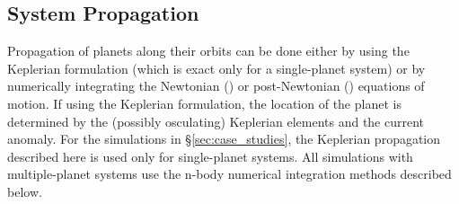 \subsection{System Propagation}\label{sec:sysProp}
Propagation of planets along their orbits can be done either by using the Keplerian formulation (which is exact only for a single-planet system) or by numerically integrating the Newtonian () or post-Newtonian () equations of motion.  If using the Keplerian formulation, the location of the planet is determined by the (possibly osculating) Keplerian elements and the current anomaly.  For the simulations in \S\ref{sec:case_studies}, the Keplerian propagation described here is used only for single-planet systems.  All simulations with multiple-planet systems use the n-body numerical integration methods described below.

